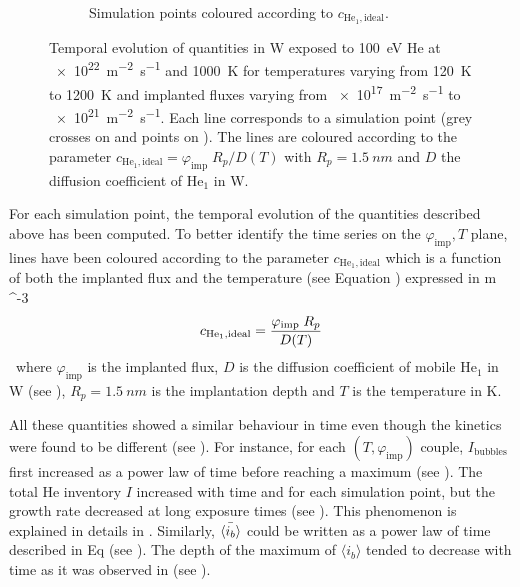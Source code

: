 \begin{figure} [ht!]
\begin{subfigure}{0.5\linewidth}
        \caption{Simulation points coloured according to $c_{\mathrm{He}_1, \mathrm{ideal}}$.}
    \end{subfigure}
    \caption{Temporal evolution of quantities in W exposed to \SI{100}{eV} He at \SI{e22}{m^{-2}.s^{-1}} and \SI{1000}{K} for temperatures varying from \SI{120}{K} to \SI{1200}{K} and implanted fluxes varying from \SI{e17}{m^{-2}s^{-1}} to \SI{e21}{m^{-2}s^{-1}}. Each line corresponds to a simulation point (grey crosses on  and points on ). The lines are coloured according to the parameter $c_{\mathrm{He}_1, \mathrm{ideal}} = \varphi_\mathrm{imp} \; R_p/D(T)$ with $R_p = \SI{1.5}{nm}$ and $D$ the diffusion coefficient of $\mathrm{He}_1$ in W.}
\end{figure}

For each simulation point, the temporal evolution of the quantities described above has been computed.
To better identify the time series on the $\varphi_\mathrm{imp}, T$ plane, lines have been coloured according to the parameter $c_{\mathrm{He}_1, \mathrm{ideal}}$ which is a function of both the implanted flux and the temperature (see Equation ) expressed in \si{m ^{-3}}.

\begin{equation}
    c_{\mathrm{He}_1, \mathrm{ideal}} = \frac{\varphi_\mathrm{imp} \; R_p}{D(T)}
    \labeq{c he1 ideal}
\end{equation}
where $\varphi_\mathrm{imp}$ is the implanted flux, $D$ is the diffusion coefficient of mobile $\mathrm{He}_1$ in W (see ), $R_p = \SI{1.5}{nm}$ is the implantation depth and $T$ is the temperature in \si{K}.

All these quantities showed a similar behaviour in time even though the kinetics were found to be different (see ).
For instance, for each $(T, \varphi_\mathrm{imp})$ couple, $I_\mathrm{bubbles}$ first increased as a power law of time before reaching a maximum (see ).
The total He inventory $I$ increased with time and for each simulation point, but the growth rate decreased at long exposure times (see ).
This phenomenon is explained in details in .
Similarly, $\Bar{\langle i_b \rangle}$ could be written as a power law of time described in Eq  (see ).
The depth of the maximum of $\langle i_b \rangle$ tended to decrease with time as it was observed in  (see ).

